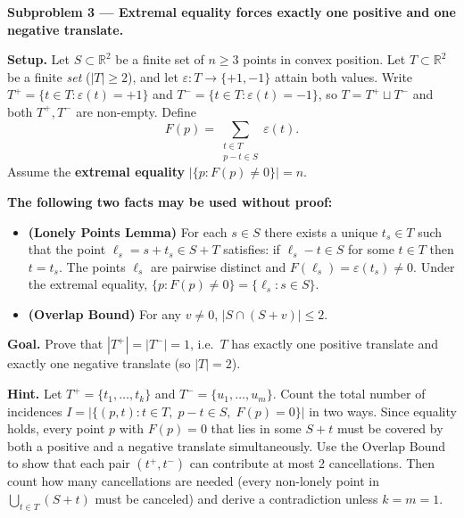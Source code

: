 \documentclass{article}
\begin{document}
\textbf{Subproblem 3 --- Extremal equality forces exactly one positive and one negative translate.}

\medskip
\textbf{Setup.}
Let $S\subset\mathbb{R}^2$ be a finite set of $n\ge 3$ points in convex position.
Let $T\subset\mathbb{R}^2$ be a finite \emph{set} ($|T|\ge 2$), and let $\varepsilon:T\to\{+1,-1\}$ attain both values.
Write $T^+ = \{t\in T:\varepsilon(t)=+1\}$ and $T^- = \{t\in T:\varepsilon(t)=-1\}$, so $T = T^+\sqcup T^-$ and both $T^+,T^-$ are non-empty.
Define
\[
  F(p) = \sum_{\substack{t\in T\\ p-t\in S}} \varepsilon(t).
\]
Assume the \textbf{extremal equality} $|\{p : F(p)\neq 0\}| = n$.

\medskip
\textbf{The following two facts may be used without proof:}
\begin{itemize}
  \item \textbf{(Lonely Points Lemma)} For each $s\in S$ there exists a unique $t_s\in T$ such that the point $\ell_s = s+t_s\in S+T$ satisfies: if $\ell_s - t\in S$ for some $t\in T$ then $t = t_s$.  The points $\ell_s$ are pairwise distinct and $F(\ell_s) = \varepsilon(t_s)\neq 0$.  Under the extremal equality, $\{p : F(p)\neq 0\} = \{\ell_s : s\in S\}$.
  \item \textbf{(Overlap Bound)} For any $v\neq 0$, $|S\cap(S+v)|\le 2$.
\end{itemize}

\medskip
\textbf{Goal.}
Prove that $|T^+| = |T^-| = 1$, i.e.\ $T$ has exactly one positive translate and exactly one negative translate (so $|T|=2$).

\medskip
\textbf{Hint.}
Let $T^+ = \{t_1,\ldots,t_k\}$ and $T^- = \{u_1,\ldots,u_m\}$.
Count the total number of incidences $I = |\{(p,t): t\in T,\; p-t\in S,\; F(p)=0\}|$ in two ways.
Since equality holds, every point $p$ with $F(p)=0$ that lies in some $S+t$ must be covered by both a positive and a negative translate simultaneously.
Use the Overlap Bound to show that each pair $(t^+, t^-)$ can contribute at most 2 cancellations.  Then count how many cancellations are needed (every non-lonely point in $\bigcup_{t\in T}(S+t)$ must be canceled) and derive a contradiction unless $k=m=1$.
\end{document}
